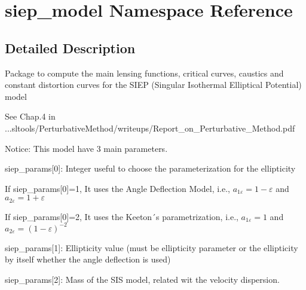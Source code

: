 \hypertarget{namespacesiep__model}{
\section{siep\_\-model Namespace Reference}
\label{namespacesiep__model}
}


\subsection{Detailed Description}
Package to compute the main lensing functions, critical curves, caustics and constant distortion curves for the SIEP (Singular Isothermal Elliptical Potential) model

See Chap.4 in ...sltools/PerturbativeMethod/writeups/Report\_\-on\_\-Perturbative\_\-Method.pdf

Notice: This model have 3 main parameters.

siep\_\-params\mbox{[}0\mbox{]}: Integer useful to choose the parameterization for the ellipticity

If siep\_\-params\mbox{[}0\mbox{]}=1, It uses the Angle Deflection Model, i.e., $ a_{1\varepsilon}=1-\varepsilon $ and $ a_{2\varepsilon}=1+\varepsilon $

If siep\_\-params\mbox{[}0\mbox{]}=2, It uses the Keeton´s parametrization, i.e., $ a_{1\varepsilon}=1$ and $ a_{2\varepsilon}=(1-\varepsilon)^{-2} $

siep\_\-params\mbox{[}1\mbox{]}: Ellipticity value (must be ellipticity parameter or the ellipticity by itself whether the angle deflection is used)

siep\_\-params\mbox{[}2\mbox{]}: Mass of the SIS model, related wit the velocity dispersion. 

